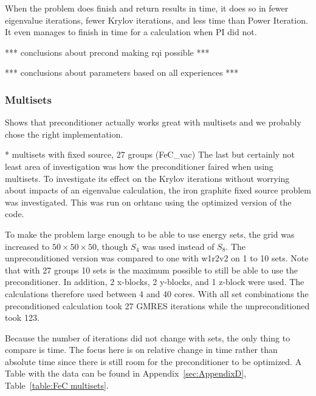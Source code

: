 When the problem does finish and return results in time, it does so in fewer eigenvalue iterations, fewer Krylov iterations, and less time than Power Iteration. It even manages to finish in time for a calculation when PI did not. 
  
  *** conclusions about precond making rqi possible ***

*** conclusions about parameters based on all experiences ***

\subsubsection{Multisets}
Shows that preconditioner actually works great with multisets and we probably chose the right implementation.

* multisets with fixed source, 27 groups (FeC\_vac)
The last but certainly not least area of investigation was how the preconditioner faired when using multisets. To investigate its effect on the Krylov iterations without worrying about impacts of an eigenvalue calculation, the iron graphite fixed source problem was investigated. This was run on orhtanc using the optimized version of the code. 

To make the problem large enough to be able to use energy sets, the grid was increased to $50 \times 50 \times 50$, though $S_{4}$ was used instead of $S_{8}$. The unpreconditioned version was compared to one with w1r2v2 on 1 to 10 sets. Note that with 27 groups 10 sets is the maximum possible to still be able to use the preconditioner. In addition, 2 x-blocks, 2 y-blocks, and 1 z-block were used. The calculations therefore used between 4 and 40 cores. With all set combinations the preconditioned calculation took 27 GMRES iterations while the unpreconditioned took 123.

Because the number of iterations did not change with sets, the only thing to compare is time. The focus here is on relative change in time rather than absolute time since there is still room for the preconditioner to be optimized. A Table with the data can be found in Appendix~\ref{sec:AppendixD}, Table~\ref{table:FeC multisets}.

